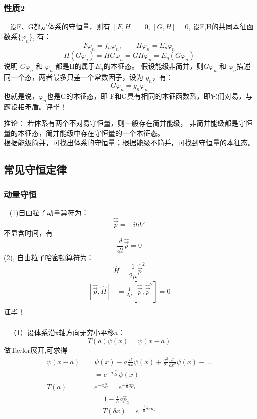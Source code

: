 \begin{frame}
    \frametitle{性质2}
    \证~ 设F、G都是体系的守恒量，则有 $[F,H]=0$, $[G,H]=0$, 设F,H的共同本征函数系$\{\varphi_n\}$, 有：\\ 
    $$F\varphi_n =f_n \varphi_n, \qquad H\varphi_n =E_n \varphi_n $$
    $$H(G\varphi_n) =HG\varphi_n=GH\varphi_n= E_n (G\varphi_n)$$
    说明 $G\varphi_n$ 和 $\varphi_n$ 都是H的属于$E_n$的本征态。
    假设能级非简并，则$G\varphi_n$ 和 $\varphi_n$描述同一个态，两者最多只差一个常数因子，设为 $g_n$，有：
    $$G\varphi_n=g_n \varphi_n$$
    也就是说，$\varphi_n$也是G的本征态，即 F和G具有相同的本征函数系，即它们对易，与题设相矛盾。评毕！\\
\end{frame}

\begin{frame}
    \begin{atcbox}{推论：}
        若体系有两个不对易守恒量，则一般存在简并能级， 非简并能级都是守恒量的本征态，简并能级中存在守恒量的一个本征态。\\
        根据能级简并，可找出体系的守恒量；根据能级不简并，可找到守恒量的本征态。
    \end{atcbox}
\end{frame}

\subsection{常见守恒定律}

\begin{frame} 
    \frametitle{动量守恒} 
    \例[22.试证明自由粒子的动量是守恒量]{}                                   
    \证~ (1)自由粒子动量算符为：
    $$ \hat{\vec{p}} = -i\hbar\nabla  $$
    不显含时间，有 $$\frac{d}{dt}\hat{\vec{p}}=0$$ 
    (2), 自由粒子哈密顿算符为： $$ \hat{H} = \frac{1}{2\mu} \hat{\vec{p}}^2 $$
    $$\begin{aligned}
        [\hat{\vec{p}},\hat{H}]&= \frac{1}{2\mu}[\hat{\vec{p}}, \hat{\vec{p}}^2 ] =0 \\
    \end{aligned}$$
    证毕！
\end{frame}

\begin{frame} 
    \frametitle{} 
    \例[23.试证明空间平移不变性导致动量守恒]{}                                
    \证~ （1）设体系沿x轴方向无穷小平移a：
    $$ T(a)\psi(x)=\psi(x-a) $$
    做Taylor展开,可求得
    \[\begin{aligned}
        \psi(x-a)=&\psi(x) -a \frac{d}{d x} \psi(x)+\frac{a^{2}}{2 !} \frac{d^{2}}{d x^{2}} \psi(x)-\ldots \\
        &=e^{-a \frac{d}{d x}} \psi(x) \\
    T(a)=&e^{-a \frac{d}{d x}}= e^{-\frac{i}{\hbar}a \hat{p}_x}\\
        &=1-\frac{i}{\hbar}a \hat{p}_x 
    \end{aligned}\]   
 $$T(\delta x)= e^{-\frac{i}{\hbar}\delta x p_x } $$ 
\end{frame}

